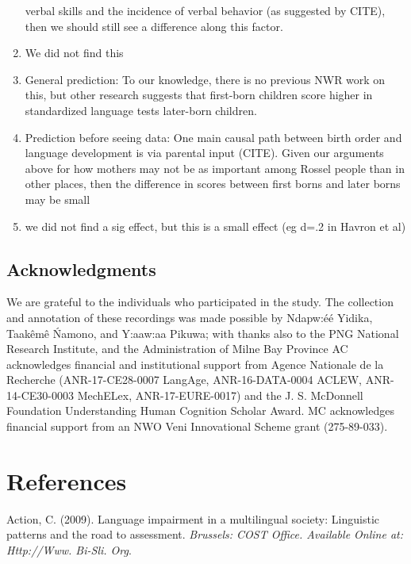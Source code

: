 \documentclass[english,,man,floatsintext]{apa6}
\begin{document}
\begin{enumerate}
  verbal skills and the incidence of verbal behavior (as suggested by
  CITE), then we should still see a difference along this factor.
\item
  We did not find this
\item
  General prediction: To our knowledge, there is no previous NWR work on
  this, but other research suggests that first-born children score
  higher in standardized language tests later-born children.
\item
  Prediction before seeing data: One main causal path between birth
  order and language development is via parental input (CITE). Given our
  arguments above for how mothers may not be as important among Rossel
  people than in other places, then the difference in scores between
  first borns and later borns may be small
\item
  we did not find a sig effect, but this is a small effect (eg d=.2 in
  Havron et al)
\end{enumerate}

\newpage

\subsection{Acknowledgments}\label{acknowledgments}

We are grateful to the individuals who participated in the study. The
collection and annotation of these recordings was made possible by
Ndapw:éé Yidika, Taakêmê Ńamono, and Y:aaw:aa Pikuwa; with thanks also
to the PNG National Research Institute, and the Administration of Milne
Bay Province AC acknowledges financial and institutional support from
Agence Nationale de la Recherche (ANR-17-CE28-0007 LangAge,
ANR-16-DATA-0004 ACLEW, ANR-14-CE30-0003 MechELex, ANR-17-EURE-0017) and
the J. S. McDonnell Foundation Understanding Human Cognition Scholar
Award. MC acknowledges financial support from an NWO Veni Innovational
Scheme grant (275-89-033).

\section{References}\label{references}

\setlength{\parindent}{-0.5in} \setlength{\leftskip}{0.5in}

\hypertarget{refs}{}
\hypertarget{ref-is08042009language}{}
Action, C. (2009). Language impairment in a multilingual society:
Linguistic patterns and the road to assessment. \emph{Brussels: COST
Office. Available Online at: Http://Www. Bi-Sli. Org}.
\end{document}
